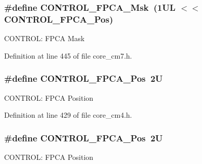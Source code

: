 \subsubsection[{\texorpdfstring{C\+O\+N\+T\+R\+O\+L\+\_\+\+F\+P\+C\+A\+\_\+\+Msk}{CONTROL_FPCA_Msk}}]{\setlength{\rightskip}{0pt plus 5cm}\#define C\+O\+N\+T\+R\+O\+L\+\_\+\+F\+P\+C\+A\+\_\+\+Msk~(1\+U\+L $<$$<$ C\+O\+N\+T\+R\+O\+L\+\_\+\+F\+P\+C\+A\+\_\+\+Pos)}\hypertarget{group___c_m_s_i_s___c_o_r_e_gad20bb0212b2e1864f24af38d93587c79}{}\label{group___c_m_s_i_s___c_o_r_e_gad20bb0212b2e1864f24af38d93587c79}
C\+O\+N\+T\+R\+OL\+: F\+P\+CA Mask 

Definition at line 445 of file core\+\_\+cm7.\+h.

\subsubsection[{\texorpdfstring{C\+O\+N\+T\+R\+O\+L\+\_\+\+F\+P\+C\+A\+\_\+\+Pos}{CONTROL_FPCA_Pos}}]{\setlength{\rightskip}{0pt plus 5cm}\#define C\+O\+N\+T\+R\+O\+L\+\_\+\+F\+P\+C\+A\+\_\+\+Pos~2U}\hypertarget{group___c_m_s_i_s___c_o_r_e_gac7018b59b07134c5363b33eb94918a58}{}\label{group___c_m_s_i_s___c_o_r_e_gac7018b59b07134c5363b33eb94918a58}
C\+O\+N\+T\+R\+OL\+: F\+P\+CA Position 

Definition at line 429 of file core\+\_\+cm4.\+h.

\subsubsection[{\texorpdfstring{C\+O\+N\+T\+R\+O\+L\+\_\+\+F\+P\+C\+A\+\_\+\+Pos}{CONTROL_FPCA_Pos}}]{\setlength{\rightskip}{0pt plus 5cm}\#define C\+O\+N\+T\+R\+O\+L\+\_\+\+F\+P\+C\+A\+\_\+\+Pos~2U}\hypertarget{group___c_m_s_i_s___c_o_r_e_gac7018b59b07134c5363b33eb94918a58}{}\label{group___c_m_s_i_s___c_o_r_e_gac7018b59b07134c5363b33eb94918a58}
C\+O\+N\+T\+R\+OL\+: F\+P\+CA Position 

